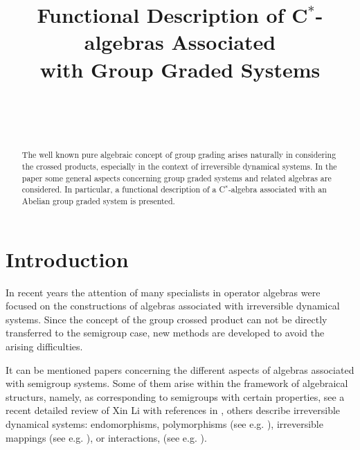 \documentclass[
11pt,%
tightenlines,%
twoside,%
onecolumn,%
nofloats,%
nobibnotes,%
nofootinbib,%
superscriptaddress,%
noshowpacs,%
centertags]%
{revtex4}
\begin{document}

\title{Functional Description of C$^*$-algebras Associated\\ with Group Graded Systems}

\author{~}
 

\author{~}
 





\begin{abstract}
The well known pure algebraic concept of group grading arises
naturally in considering the crossed products, especially in the
context of irreversible dynamical systems. In the paper some general
aspects concerning group graded systems and  related algebras are
considered. In particular, a functional description of a
C$^*$-algebra associated with an Abelian group graded system is
presented.
\end{abstract}

\maketitle



\section{Introduction}
In recent years the attention of many specialists in operator algebras were focused on the constructions of algebras associated with irreversible dynamical systems.
Since the concept of the group crossed product can not be directly transferred to the semigroup case, new methods are developed to avoid the arising difficulties.

It can be mentioned papers concerning the different aspects of  algebras associated with semigroup systems.
Some of them arise within the framework of algebraical structurs, namely, as corresponding to semigroups with certain properties,
see a recent detailed review  of Xin Li with references in \cite{L2}, others describe  irreversible dynamical systems: endomorphisms, polymorphisms
(see e.g. \cite{A, AR, CV, SV}), irreversible mappings (see e.g. \cite{GK}), or interactions, (see e.g. \cite{E1, ER}).
\end{document}
